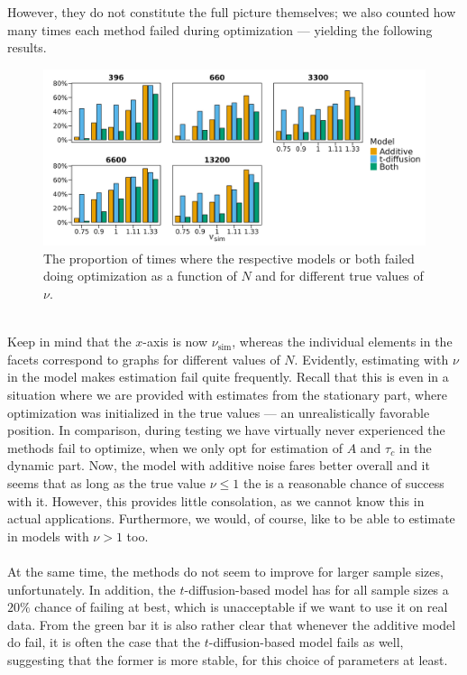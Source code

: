 However, they do not constitute the full picture themselves; we also counted how many times each method failed during optimization — yielding the following results.
\begin{figure}[h!]
    \begin{center}
        \includegraphics[scale = .11]{figures/error_count_plot.jpeg}
        \caption{The proportion of times where the respective models or both failed doing optimization as a function of $N$ and for different true values of $\nu$.}
        \label{figure:error_count_nu_experiment}
    \end{center}
\end{figure}\\
Keep in mind that the $x$-axis is now $\nu_{\mathrm{sim}}$, whereas the individual elements in the facets correspond to graphs for different values of $N$. Evidently, estimating with $\nu$ in the model makes estimation fail quite frequently. Recall that this is even in a situation where we are provided with estimates from the stationary part, where optimization was initialized in the true values — an unrealistically favorable position. In comparison, during testing we have virtually never experienced the methods fail to optimize, when we only opt for estimation of $A$ and $\tau_c$ in the dynamic part. Now, the model with additive noise fares better overall and it seems that as long as the true value $\nu\leq 1$ the is a reasonable chance of success with it. However, this provides little consolation, as we cannot know this in actual applications. Furthermore, we would, of course, like to be able to estimate in models with $\nu > 1$ too.\\\\
At the same time, the methods do not seem to improve for larger sample sizes, unfortunately. In addition, the $t$-diffusion-based model has for all sample sizes a $20\%$ chance of failing at best, which is unacceptable if we want to use it on real data. From the green bar it is also rather clear that whenever the additive model do fail, it is often the case that the $t$-diffusion-based model fails as well, suggesting that the former is more stable, for this choice of parameters at least. 
